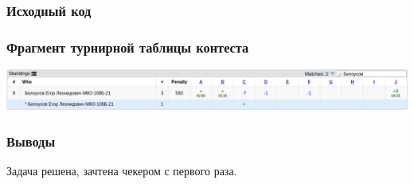 \subsubsection*{Исходный код}


\subsubsection*{Фрагмент турнирной таблицы контеста}
\begin{center}
\includegraphics[width=\textwidth]{standings/20220709/table.png}\newline\noindent
\end{center}

\subsubsection*{Выводы}

Задача решена, зачтена чекером с первого раза.

\pagebreak
